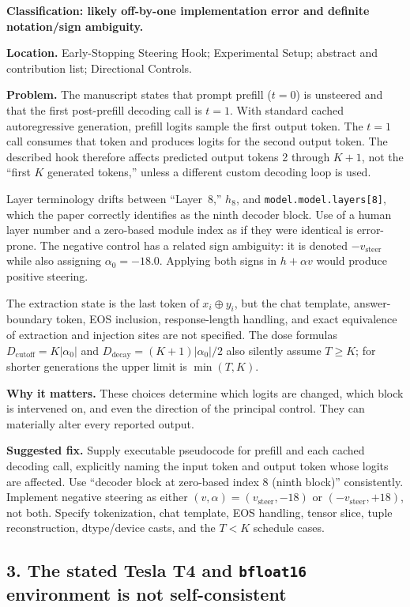 \documentclass[11pt]{article}
\begin{document}
\textbf{Classification: likely off-by-one implementation error and definite notation/sign ambiguity.}

\textbf{Location.} Early-Stopping Steering Hook; Experimental Setup; abstract and contribution list; Directional Controls.

\textbf{Problem.} The manuscript states that prompt prefill ($t=0$) is unsteered and that the first post-prefill decoding call is $t=1$.  With standard cached autoregressive generation, prefill logits sample the first output token.  The $t=1$ call consumes that token and produces logits for the second output token.  The described hook therefore affects predicted output tokens 2 through $K+1$, not the ``first $K$ generated tokens,'' unless a different custom decoding loop is used.

Layer terminology drifts between ``Layer~8,'' $h_8$, and \texttt{model.model.layers[8]}, which the paper correctly identifies as the ninth decoder block.  Use of a human layer number and a zero-based module index as if they were identical is error-prone.  The negative control has a related sign ambiguity: it is denoted $-v_{\text{steer}}$ while also assigning $\alpha_0=-18.0$.  Applying both signs in $h+\alpha v$ would produce positive steering.

The extraction state is the last token of $x_i\oplus y_i$, but the chat template, answer-boundary token, EOS inclusion, response-length handling, and exact equivalence of extraction and injection sites are not specified.  The dose formulas $D_{\text{cutoff}}=K|\alpha_0|$ and $D_{\text{decay}}=(K+1)|\alpha_0|/2$ also silently assume $T\ge K$; for shorter generations the upper limit is $\min(T,K)$.

\textbf{Why it matters.} These choices determine which logits are changed, which block is intervened on, and even the direction of the principal control.  They can materially alter every reported output.

\textbf{Suggested fix.} Supply executable pseudocode for prefill and each cached decoding call, explicitly naming the input token and output token whose logits are affected.  Use ``decoder block at zero-based index 8 (ninth block)'' consistently.  Implement negative steering as either $(v,\alpha)=\left(v_{\text{steer}},-18\right)$ or $\left(-v_{\text{steer}},+18\right)$, not both.  Specify tokenization, chat template, EOS handling, tensor slice, tuple reconstruction, dtype/device casts, and the $T<K$ schedule cases.

\subsection*{3. The stated Tesla T4 and \texttt{bfloat16} environment is not self-consistent}
\end{document}
